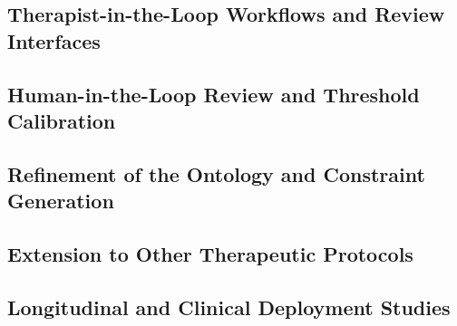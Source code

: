
\subsection{Therapist-in-the-Loop Workflows and Review Interfaces}


\subsection{Human-in-the-Loop Review and Threshold Calibration}


\subsection{Refinement of the Ontology and Constraint Generation}


\subsection{Extension to Other Therapeutic Protocols}


\subsection{Longitudinal and Clinical Deployment Studies}

